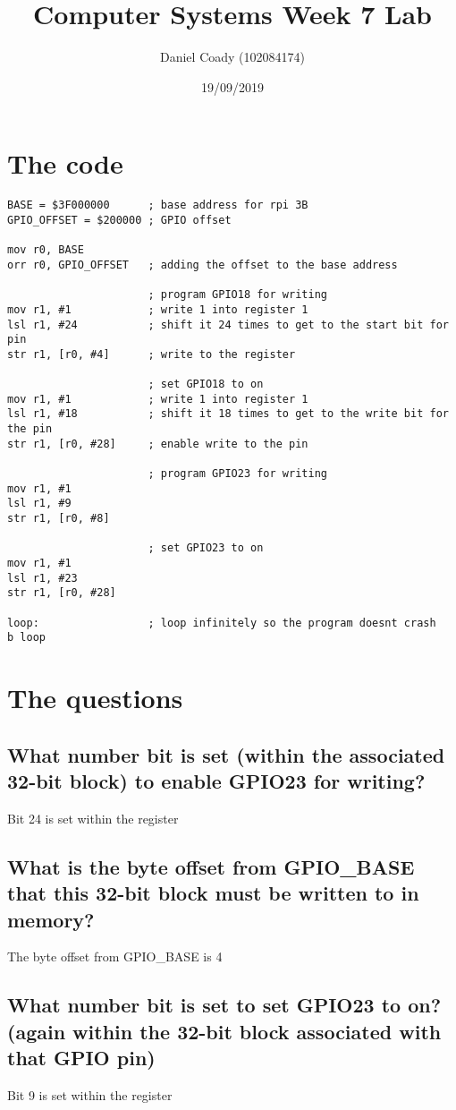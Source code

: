 \documentclass[11pt]{scrartcl}
\title{Computer Systems Week 7 Lab}
\author{Daniel Coady (102084174)}
\date{19/09/2019}
\begin{document}
\maketitle

\section*{The code}

\begin{verbatim}
BASE = $3F000000      ; base address for rpi 3B
GPIO_OFFSET = $200000 ; GPIO offset

mov r0, BASE
orr r0, GPIO_OFFSET   ; adding the offset to the base address

                      ; program GPIO18 for writing
mov r1, #1            ; write 1 into register 1
lsl r1, #24           ; shift it 24 times to get to the start bit for pin
str r1, [r0, #4]      ; write to the register

                      ; set GPIO18 to on
mov r1, #1            ; write 1 into register 1
lsl r1, #18           ; shift it 18 times to get to the write bit for the pin
str r1, [r0, #28]     ; enable write to the pin

                      ; program GPIO23 for writing
mov r1, #1
lsl r1, #9
str r1, [r0, #8]

                      ; set GPIO23 to on
mov r1, #1
lsl r1, #23
str r1, [r0, #28]

loop:                 ; loop infinitely so the program doesnt crash
b loop
\end{verbatim}

\section*{The questions}
\subsection*{What number bit is set (within the associated 32-bit block) to enable GPIO23 for writing?}
Bit 24 is set within the register

\subsection*{What is the byte offset from GPIO\_BASE that this 32-bit block must be written to in memory?}
The byte offset from GPIO\_BASE is 4

\subsection*{What number bit is set to set GPIO23 to on? (again within the 32-bit block associated with that GPIO pin)}
Bit 9 is set within the register
\end{document}
